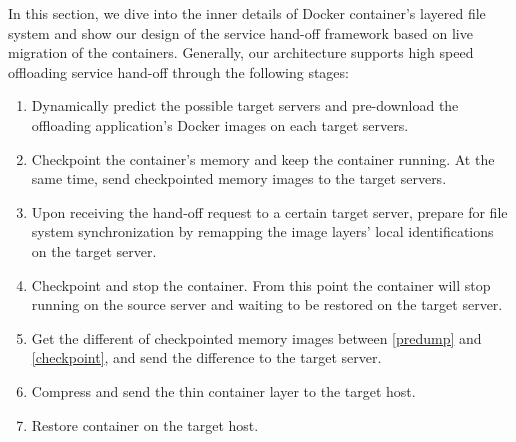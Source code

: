 
In this section, we dive into the inner details of Docker container's layered file system and show our design of the  service hand-off framework based on live migration of the containers.  Generally, our architecture supports high speed offloading service hand-off through the following stages:

\begin{enumerate}[label=\textbf{S\arabic*}]

\item Dynamically predict the possible target servers and pre-download the offloading application's Docker images on each target servers.

\item \label{predump} Checkpoint the container's memory and keep the container running. At the same time, send checkpointed memory images to the target servers. 

\item \label{prepare} Upon receiving the hand-off request to a certain target server, prepare for file system synchronization by remapping the image layers' local identifications on the target server.


\item \label{checkpoint} Checkpoint and stop the container. From this point the container will stop running on the source server and waiting to be restored on the target server.

\item \label{img-sync} Get the different of checkpointed memory images between \ref{predump} and \ref{checkpoint}, and send the difference to the target server. 

\item \label{fs-sync} Compress and send the thin container layer to the target host.

\item \label{restore} Restore container on the target host.

\end{enumerate}

